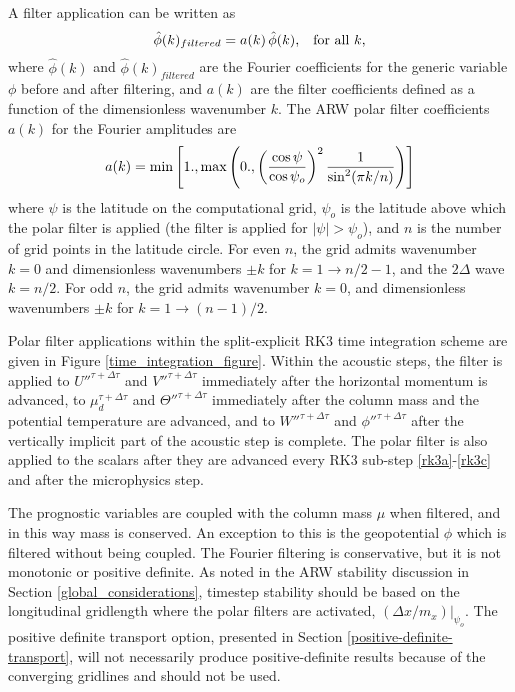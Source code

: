 A filter application can be written as
%
\begin{equation}
\hat\phi(k)_{filtered} = a(k)\,\hat\phi(k), \,\,\,\,\, \hbox{for all }k,
\notag
\end{equation}
%
where $\hat\phi(k)$ and $\hat\phi(k)_{filtered}$ are the Fourier
coefficients for the generic variable $\phi$ before and after filtering,
and $a(k)$ are the filter coefficients defined as a function of the
dimensionless wavenumber $k$.  The ARW polar filter coefficients $a(k)$ 
for the Fourier amplitudes are
%
\begin{equation}
a(k) = \hbox{min}\left[1.,\hbox{max}\left(0.,
\left({\cos{\psi} \over \cos{\psi_o}}\right)^2  {1 \over \sin^2({\pi k/n)}}
\right)\right]
\notag
\end{equation}
%
where $\psi$ is the latitude on the computational grid, $\psi_o$ is the
latitude above which the polar filter is applied (the filter is applied
for $ |\psi| > \psi_o$), and $n$ is the number of grid points in the latitude
circle.  For even $n$, the grid
admits wavenumber $k=0$ and dimensionless wavenumbers $\pm k$ for
$k=1\to n/2 - 1$, and the $2\Delta$ wave $k=n/2$.  For odd $n$, the grid
admits wavenumber $k=0$, and dimensionless wavenumbers $\pm k$ for
$k=1\to (n-1)/2 $. 

Polar filter applications within the split-explicit RK3 time integration
scheme are given in Figure \ref{time_integration_figure}.
Within the acoustic steps,
the filter is applied to
${U''}^{\tau+\Delta\tau}$ and ${V''}^{\tau+\Delta\tau}$ immediately
after the horizontal momentum is advanced, to $\mu_d^{\tau+\Delta\tau}$
and ${\Theta''}^{\tau+\Delta\tau}$ immediately after the column mass and
the potential temperature are advanced, and to ${W''}^{\tau+\Delta\tau}$
and ${\phi''}^{\tau+\Delta\tau}$ after the vertically implicit part of
the acoustic step is complete.  The polar filter is also applied to the
scalars after they are advanced every RK3 sub-step
\eqref{rk3a}-\eqref{rk3c} and after the microphysics step.

The prognostic variables are coupled with the column mass $\mu$ when
filtered, and in this way mass is conserved.  An exception to this is
the geopotential $\phi$ which is filtered without being coupled.  The
Fourier filtering is conservative, but it is not monotonic or positive
definite.  As noted in the ARW stability discussion in Section
\ref{global_considerations}, timestep stability should be based on the longitudinal
gridlength where the polar filters are activated, $(\Delta
x/m_x)|_{\psi_o}$.  The positive definite transport option, presented in
Section \ref{positive-definite-transport}, will not necessarily produce
positive-definite results because of the converging gridlines and should
not be used.

